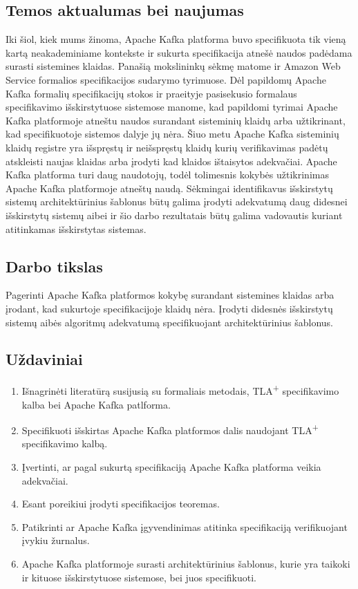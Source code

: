 \documentclass{VUMIFPSmagistrinis}
\begin{document}
	\subsection{Temos aktualumas bei naujumas}
		Iki šiol, kiek mums žinoma, Apache Kafka platforma buvo specifikuota tik vieną kartą neakademiniame kontekste ir sukurta specifikacija atnešė naudos padėdama surasti sistemines klaidas.
		Panašią mokslininkų sėkmę matome ir Amazon Web Service formalios specifikacijos sudarymo tyrimuose.
		Dėl papildomų Apache Kafka formalių specifikacijų stokos ir praeityje pasisekusio formalaus specifikavimo išskirstytuose sistemose manome, kad papildomi tyrimai Apache Kafka platformoje atneštu naudos surandant sisteminių klaidų arba užtikrinant, kad specifikuotoje sistemos dalyje jų nėra.
		Šiuo metu Apache Kafka sisteminių klaidų registre yra išspręstų  ir neišspręstų  klaidų kurių verifikavimas padėtų atskleisti naujas klaidas arba įrodyti kad klaidos ištaisytos adekvačiai.
		Apache Kafka platforma turi daug naudotojų, todėl tolimesnis kokybės užtikrinimas Apache Kafka platformoje atneštų naudą.
		Sėkmingai identifikavus išskirstytų sistemų architektūrinius šablonus būtų galima įrodyti adekvatumą daug didesnei išskirstytų sistemų aibei ir šio darbo rezultatais būtų galima vadovautis kuriant atitinkamas išskirstytas sistemas. 
	
	\subsection{Darbo tikslas}
		Pagerinti Apache Kafka platformos kokybę surandant sistemines klaidas arba įrodant, kad sukurtoje specifikacijoje klaidų nėra.
		Įrodyti didesnės išskirstytų sistemų aibės algoritmų adekvatumą specifikuojant architektūrinius šablonus.
	
	\subsection{Uždaviniai}
		\begin{enumerate}
			\item{Išnagrinėti literatūrą susijusią su formaliais metodais, TLA\textsuperscript{+} specifikavimo kalba bei Apache Kafka patlforma.}
			\item{Specifikuoti išskirtas Apache Kafka platformos dalis naudojant TLA\textsuperscript{+} specifikavimo kalbą.}
			\item{Įvertinti, ar pagal sukurtą specifikaciją Apache Kafka platforma veikia adekvačiai.}
			\item{Esant poreikiui įrodyti specifikacijos teoremas.}
			\item{Patikrinti ar Apache Kafka įgyvendinimas atitinka specifikaciją verifikuojant įvykiu žurnalus.}
			\item{Apache Kafka platformoje surasti architektūrinius šablonus, kurie yra taikoki ir kituose išskirstytuose sistemose, bei juos specifikuoti.}
		\end{enumerate}
	
\end{document}

